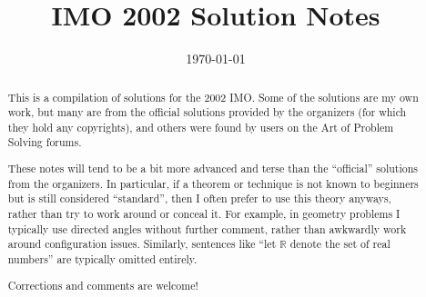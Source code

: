 \documentclass[11pt]{scrartcl}
\title{IMO 2002 Solution Notes}
\date{\today}
\begin{document}
\maketitle

\begin{abstract}
This is a compilation of solutions
for the 2002 IMO.
Some of the solutions are my own work,
but many are from the official solutions provided by the organizers
(for which they hold any copyrights),
and others were found by users on the Art of Problem Solving forums.

These notes will tend to be a bit more advanced and terse than the ``official''
solutions from the organizers.
In particular, if a theorem or technique is not known to beginners
but is still considered ``standard'', then I often prefer to
use this theory anyways, rather than try to work around or conceal it.
For example, in geometry problems I typically use directed angles
without further comment, rather than awkwardly work around configuration issues.
Similarly, sentences like ``let $\mathbb{R}$ denote the set of real numbers''
are typically omitted entirely.

Corrections and comments are welcome!
\end{abstract}

\tableofcontents
\newpage

\addtocounter{section}{-1}
\end{document}
